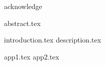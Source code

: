 \documentclass[UTF8, nocolorlinks, openany, spacing, pdftoc, pkuspace]{impthss}
\begin{document}
	\covermatter
 	
 	\null\newpage
 	
 	\null\newpage

	
	
	{acknowledge}
	
	\frontmatter
	{abstract.tex}
	\tableofcontents

	\mainmatter
	{introduction.tex}
	{description.tex}
	\begin{comment}
	{dynamic_range.tex}
	{pmt_test.tex}
	{construction.tex}
	{cosmic_ray.tex}
	{heavy_ion.tex}
	{conclusion.tex}
	\end{comment}
	\appendix
	\printbibliography[
		heading = bibintoc,
		sorting = ecnty
	]
	{app1.tex}
	{app2.tex}
	
	
	\backmatter
	
\end{document}
